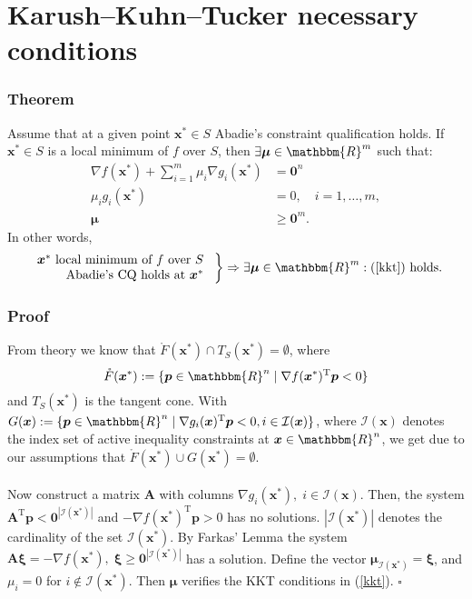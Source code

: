 \documentclass[12pt, a4paper]{article}
\begin{document}
\section{Karush–Kuhn–Tucker necessary conditions}
\subsubsection*{Theorem}
Assume that at a given point $\bm{x}^*\in S$ Abadie's constraint qualification holds. If $\bm{x}^*\in S$ is a local minimum of $f$ over $S$, then $\exists \boldsymbol{\mu}\in\mathbbm{R}^m$ such that:
\begin{equation}
\label{kkt}
\begin{split}
\nabla f(\bm{x}^*) + \sum_{i=1}^m \mu_i \nabla g_i(\bm{x}^*) &= \bm{0}^n\\
\mu_i g_i(\bm{x}^*) &= 0, \quad  i = 1,\dots ,m, \\
\boldsymbol{\mu}&\geq \bm{0}^m.
\end{split}
\end{equation}
In other words,
\begin{equation*}
\left.\begin{array}{r}

  \bm{x}^* \text{ local minimum of $f$ over $S$ } \\
  \text{Abadie's CQ holds at $\bm{x}^*$ }

\end{array}\right\} \Rightarrow \exists \boldsymbol{\mu}\in\mathbbm{R}^m : (\ref{kkt}) \text{ holds.}
\end{equation*}

\subsubsection*{Proof}
From theory we know that $\mathring{F}(\bm{x}^*)\cap T_S(\bm{x}^*)=\emptyset$, where
\begin{equation*}
\mathring{F}(\bm{x}^*):=\{\bm{p}\in\mathbbm{R}^n \;|\; \nabla f(\bm{x}^*)^{\text{T}}\bm{p}<0\}
\end{equation*}
and 
$T_S(\bm{x}^*)$ is the tangent cone. With $G(\bm{x}) := \{\bm{p}\in \mathbbm{R}^n \; | \; \nabla g_i(\bm{x})^{\text{T}}\bm{p}<0, i\in \mathcal{I}(\bm{x})\}$, where $\mathcal{I}(\bm{x})$ denotes the index set of active inequality constraints at $\bm{x}\in\mathbbm{R}^n$, we get due to our assumptions that $\mathring{F}(\bm{x}^*)\cup G(\bm{x}^*)=\emptyset$.
\\\\
Now construct a matrix $\bm{A}$ with columns $\nabla g_i(\bm{x}^*),\; i\in\mathcal{I}(\bm{x})$. Then, the system $\bm{A}^{\text{T}}\bm{p}<\bm{0}^{|\mathcal{I}(\bm{x}^*)|}$ and $-\nabla f(\bm{x}^*)^{\text{T}}\bm{p}>0$ has no solutions. $|\mathcal{I}(\bm{x}^*)|$ denotes the cardinality of the set $\mathcal{I}(\bm{x}^*)$. By Farkas' Lemma the system $\bm{A}\boldsymbol{\xi} = -\nabla f(\bm{x}^*),\; \boldsymbol{\xi} \geq \bm{0}^{|\mathcal{I}(\bm{x}^*)|}$ has a solution. Define the vector $\boldsymbol{\mu}_{\mathcal{I}(\bm{x}^*)} = \boldsymbol{\xi}$, and $\mu_i = 0$ for $i\not\in\mathcal{I}(\bm{x}^*)$. Then $\boldsymbol{\mu}$ verifies the KKT conditions in (\ref{kkt}). $\square$
\end{document}
